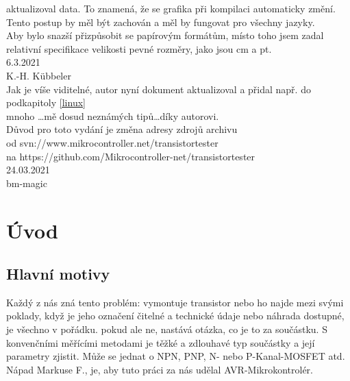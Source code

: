 aktualizoval data. To znamená, že se grafika při kompilaci automaticky změní. \\
Tento postup by měl být zachován a měl by fungovat pro všechny jazyky. \\
Aby bylo snazší přizpůsobit se papírovým formátům, místo toho jsem zadal relativní specifikace velikosti
pevné rozměry, jako jsou cm a pt. 
\vspace*{0.2cm}
\\6.3.2021
\\K.-H. Kübbeler
\vspace*{0.2cm}
\\ Jak je víše viditelné, autor nyní dokument aktualizoval a přidal např. do podkapitoly \ref{linux}
\\mnoho \dots mě dosud neznámých tipů\dots díky autorovi.
\\Důvod pro toto vydání je změna adresy zdrojů archivu 
\\od svn://www.mikrocontroller.net/transistortester 
\\na https://github.com/Mikrocontroller-net/transistortester ~\cite{tt}
\vspace*{0.3cm}
\\24.03.2021\
\vspace*{0.2cm}
\\bm-magic 
\newpage
\section*{Úvod}

\subsection*{Hlavní motivy}
Každý z nás zná tento problém: vymontuje transistor nebo ho najde mezi svými poklady, když je jeho označení čitelné a technické údaje nebo náhrada dostupné, je všechno v pořádku.
pokud ale ne, nastává otázka, co je to za součástku.
S konvenčními měřícími metodami je těžké a zdlouhavé typ součástky a její parametry zjistit.
Může se jednat o NPN, PNP, N- nebo P-Kanal-MOSFET atd. 
Nápad Markuse F., je, aby tuto práci za nás udělal AVR-Mikrokontrolér.

